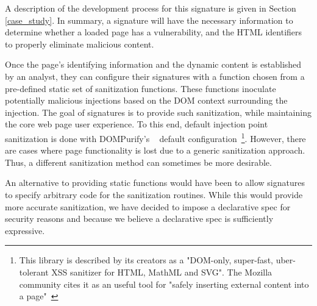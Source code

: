 A description of the development process for this signature is given in Section \ref{case_study}. In summary, a signature will have the necessary information to determine whether a loaded page has a vulnerability, and the HTML identifiers to properly eliminate malicious content.
  
Once the page's identifying information and the dynamic content is established by an analyst, they can configure their signatures with a function chosen from a pre-defined static set of sanitization functions. These functions inoculate potentially malicious injections based on the DOM context surrounding the injection. The goal of signatures is to provide such sanitization, while maintaining the core web page user experience. To this end, default injection point sanitization is done with DOMPurify's  ~\cite{10.1007/978-3-319-66399-9_7} default configuration~\footnote{This library is described by its creators as a "DOM-only, super-fast, uber-tolerant XSS sanitizer for HTML, MathML and SVG". The Mozilla community cites it as an useful tool for "safely inserting external content into a page"~\cite{safecontent}}. However, there are cases where page functionality is lost due to a generic sanitization approach. Thus, a different sanitization method can sometimes be more desirable.
  
An alternative to providing static functions would have been to allow signatures to
specify arbitrary code for the sanitization routines. While this would
provide more accurate sanitization, we have decided to
impose a declarative spec for security reasons and because we believe
a declarative spec is sufficiently expressive.

 
